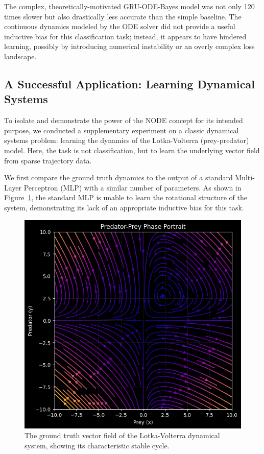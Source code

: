 The complex, theoretically-motivated GRU-ODE-Bayes model was not only 120 times slower but also drastically 
less accurate than the simple baseline. 
The continuous dynamics modeled by the ODE solver did not provide a useful inductive bias for this classification task; 
instead, it appears to have hindered learning, possibly by introducing numerical instability or an overly complex loss landscape.

\subsection{A Successful Application: Learning Dynamical Systems}

To isolate and demonstrate the power of the NODE concept for its intended purpose, we conducted a 
supplementary experiment on a classic dynamical systems problem: 
learning the dynamics of the Lotka-Volterra (prey-predator) model. 
Here, the task is not classification, but to learn the underlying vector field from sparse trajectory data.

We first compare the ground truth dynamics to the output of a standard Multi-Layer Perceptron (MLP) with a similar number of parameters. 
As shown in Figure~\ref{fig:lv_true_vs_mlp}, the standard MLP is unable to learn the rotational structure of the system,
demonstrating its lack of an appropriate inductive bias for this task.

\begin{figure}[h!]
  \centering
  \includegraphics[width=0.8\linewidth]{figures/lv_true.png}
  \caption{The ground truth vector field of the Lotka-Volterra dynamical system, 
  showing its characteristic stable cycle.}
  \label{fig:lv_true_vs_mlp}
\end{figure}

